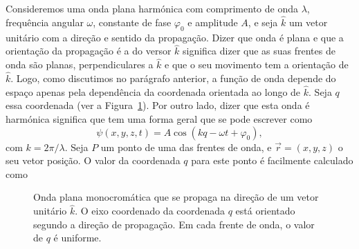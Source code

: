 Consideremos uma onda plana harmónica com comprimento de onda $\lambda$,
frequência angular $\omega$, constante de fase $\varphi_0$ e amplitude $A$, e seja
$\hat k$ um vetor unitário com a direção e sentido da propagação. Dizer que
onda é plana e que a orientação da propagação é a do versor $\hat k$ significa
dizer que as suas frentes de onda são planas, perpendiculares a $\hat k$ e que
o seu movimento tem a orientação de $\hat k$. Logo, como discutimos no parágrafo
anterior, a função de onda depende do espaço apenas pela dependência da
coordenada orientada ao longo de $\hat k$. Seja $q$ essa coordenada (ver a
Figura~\ref{fig:f050}).  Por outro lado, dizer que esta onda é harmónica
significa que tem uma forma geral que se pode escrever como
\begin{equation}\label{eq:eq0}
  \psi(x,y,z,t)=A\cos\left(kq-\omega t+\varphi_0\right),
\end{equation}
com $k=2\pi/\lambda$. Seja $P$ um ponto de uma das frentes de onda, e
$\vec r=(x,y,z)$ o seu vetor posição. O valor da coordenada $q$ para este ponto
é facilmente calculado como
\begin{figure}[htb]
  {\centering
    \par
  }
  \caption{\label{fig:f050}Onda plana monocromática que se propaga na direção de
    um vetor unitário $\hat k$. O eixo coordenado da coordenada $q$ está
    orientado segundo a direção de propagação. Em cada frente de onda, o valor
  de $q$ é uniforme.}
\end{figure}
